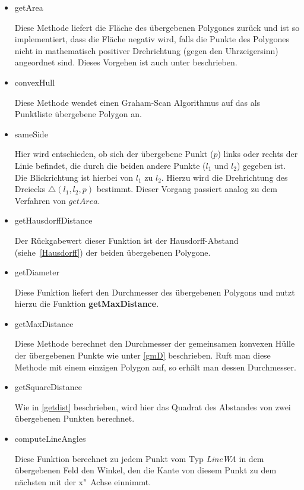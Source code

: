 \begin{itemize}

\item getArea

Diese Methode liefert die Fläche des übergebenen Polygones zurück und ist so implementiert, dass die Fläche negativ wird, falls die Punkte des Polygones nicht in mathematisch positiver Drehrichtung (gegen den Uhrzeigersinn) angeordnet sind. Dieses Vorgehen ist auch unter \cite{BW} beschrieben.

\item convexHull

Diese Methode wendet einen Graham-Scan Algorithmus auf das als Punktliste übergebene Polygon an.

\item sameSide

Hier wird entschieden, ob sich der übergebene Punkt ($p$) links oder rechts der Linie befindet, die durch die beiden andere Punkte  ($l_1$ und $l_2$) gegeben ist. Die Blickrichtung ist hierbei von $l_1$ zu $l_2$. Hierzu wird die Drehrichtung des Dreiecks $\bigtriangleup(l_1,l_2,p)$ bestimmt. Dieser Vorgang passiert analog zu  dem Verfahren von $getArea$.

\item getHausdorffDistance

Der Rückgabewert dieser Funktion ist der Hausdorff-Abstand (siehe~\vref{Hausdorff}) der beiden übergebenen Polygone. 

\item getDiameter

Diese Funktion liefert den Durchmesser des übergebenen Polygons und nutzt hierzu die Funktion \textbf{getMaxDistance}.

\item getMaxDistance

Diese Methode berechnet den Durchmesser der gemeinsamen konvexen Hülle der übergebenen Punkte wie unter \vref{gmD} beschrieben. Ruft man diese Methode mit einem einzigen Polygon auf, so erhält man dessen Durchmesser.

\item getSquareDistance

Wie in \vref{getdist} beschrieben, wird hier das Quadrat des Abstandes von zwei übergebenen Punkten berechnet.

\item computeLineAngles

Diese Funktion berechnet zu jedem Punkt vom Typ \textit{LineWA} in dem übergebenen Feld den Winkel, den die Kante von diesem Punkt zu dem nächsten  mit der x"~Achse einnimmt. 


\end{itemize}
